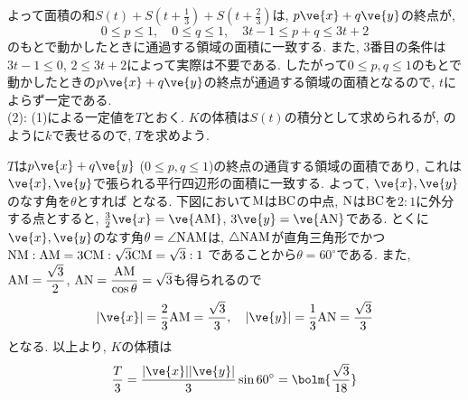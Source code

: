  よって面積の和$S(t) + S(t+\frac{1}{3}) + S(t+\frac{2}{3})$は, $p\ve{x} + q\ve{y}$の終点が,
 \[0\leq p\leq 1,\quad 0\leq q\leq 1,\quad 3t-1 \leq p + q \leq 3t + 2\]
 のもとで動かしたときに通過する領域の面積に一致する. また, 3番目の条件は$3t - 1 \leq 0$, $2\leq 3t+2$によって実際は不要である. したがって$0\leq p,q\leq 1$のもとで動かしたときの$p\ve{x} + q\ve{y}$の終点が通過する領域の面積となるので, $t$によらず一定である. \\
 (2): (1)による一定値を$T$とおく. $K$の体積は$S(t)$の積分として求められるが,
 のように$k$で表せるので, $T$を求めよう. \par
 $T$は$p\ve{x} + q\ve{y}$ ($0\leq p,q\leq 1$)の終点の通貨する領域の面積であり, これは$\ve{x}, \ve{y}$で張られる平行四辺形の面積に一致する. よって, $\ve{x}, \ve{y}$のなす角を$\theta$とすれば
 となる. 下図において${\rm M}$は${\rm BC}$の中点, ${\rm N}$は${\rm BC}$を$2:1$に外分する点とすると,
 $\frac{3}{2} \ve{x} = \ve{\rm AM}$, $3\ve{y} = \ve{\rm AN}$である. とくに$\ve{x}, \ve{y}$のなす角$\theta = \angle{\rm NAM}$は, $\triangle{\rm NAM}$が直角三角形でかつ${\rm NM}: {\rm AM} = 3{\rm CM}:\sqrt{3}{\rm CM} = \sqrt{3}:1$ であることから$\theta = 60^{\circ}$である. また, ${\rm AM} = \dfrac{\sqrt{3}}{2}$, ${\rm AN} = \dfrac{{\rm AM}}{\cos{\theta}} = \sqrt{3}$も得られるので
 \[|\ve{x}| = \dfrac{2}{3}{\rm AM} = \dfrac{\sqrt{3}}{3}, \quad |\ve{y}| = \dfrac{1}{3}{\rm AN} = \dfrac{\sqrt{3}}{3}\]
 となる. 以上より, $K$の体積は
 \[
 \dfrac{T}{3} = \dfrac{|\ve{x}||\ve{y}|}{3}\sin{60^{\circ}} = \bolm{\dfrac{\sqrt{3}}{18}}
 \]
\begin{center}
\end{center}
